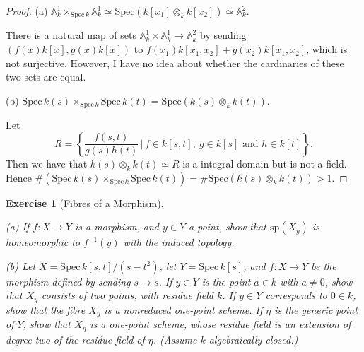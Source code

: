 \documentclass{amsart}
\newtheorem{exe}{Exercise}[subsection]
\begin{document}
\begin{proof}
	(a) $\mathbb{A}_k^1 \times_{\mathrm{Spec}\, k} \mathbb{A}_k^1\simeq \mathrm{Spec}(k[x_1]\otimes_k k[x_2])\simeq \mathbb{A}_k^2$.
	
	There is a natural map of sets $\mathbb{A}_k^1\times\mathbb{A}_k^1\to\mathbb{A}_k^2$ by sending $(f(x)k[x],g(x)k[x])$ to $f(x_1)k[x_1,x_2]+g(x_2)k[x_1,x_2]$, which is not surjective. However, I have no idea about whether the cardinaries of these two sets are equal.
	
	(b) $\mathrm{Spec}\, k(s)\times_{\mathrm{Spec}\, k}\mathrm{Spec}\, k(t)=\mathrm{Spec} (k(s)\otimes _k k(t))$.
	
	Let $$R=\left\{\frac{f(s,t)}{g(s)h(t)}\,\Bigg|\,f\in k[s,t],\ g\in k[s]\text{ and }h\in k[t]\right\}.$$Then we have that $k(s)\otimes_k k(t)\simeq R$ is a integral domain but is not a field. Hence $\#(\mathrm{Spec}\, k(s)\times_{\mathrm{Spec}\, k}\mathrm{Spec}\, k(t))=\#\mathrm{Spec} (k(s)\otimes _k k(t))>1$.
\end{proof}

\begin{exe}[Fibres of a Morphism]
	\ 
	
	(a) If $f: X\rightarrow Y$ is a morphism, and $y\in Y$ a point, show that $\mathrm{sp}(X_y)$ is homeomorphic to $f^{-1}(y)$
	with the induced topology.
	
	(b) Let $X=\mathrm{Spec}\,k[s,t]/(s-t^2)$, let $Y=\mathrm{Spec}\,k[s]$, and $f:X\to Y$ be the morphism defined by sending $s\to s$. If $y\in Y$ is the point $a\in k$ with $a\neq0$, show that $X_y$ consists of two points, with residue field $k$. If $y\in Y$ corresponds to $0\in k$, show that the fibre $X_y$ is a nonreduced one-point scheme. If $\eta$ is the generic point of $Y$, show that $X_\eta$ is a one-point scheme, whose residue field is an extension of degree two of the residue field of $\eta$. (Assume $k$ algebraically closed.)
\end{exe}
\end{document}
